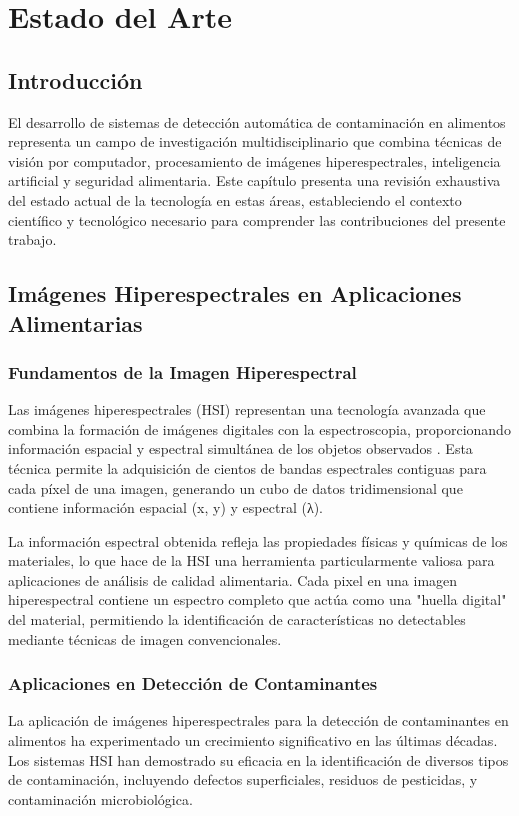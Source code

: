 \chapter{Estado del Arte}

\section{Introducción}
El desarrollo de sistemas de detección automática de contaminación en alimentos representa un campo de investigación multidisciplinario que combina técnicas de visión por computador, procesamiento de imágenes hiperespectrales, inteligencia artificial y seguridad alimentaria. Este capítulo presenta una revisión exhaustiva del estado actual de la tecnología en estas áreas, estableciendo el contexto científico y tecnológico necesario para comprender las contribuciones del presente trabajo.

\section{Imágenes Hiperespectrales en Aplicaciones Alimentarias}

\subsection{Fundamentos de la Imagen Hiperespectral}
Las imágenes hiperespectrales (HSI) representan una tecnología avanzada que combina la formación de imágenes digitales con la espectroscopia, proporcionando información espacial y espectral simultánea de los objetos observados \cite{lu2020medical,zhang2016hyperspectral}. Esta técnica permite la adquisición de cientos de bandas espectrales contiguas para cada píxel de una imagen, generando un cubo de datos tridimensional que contiene información espacial (x, y) y espectral (λ).

La información espectral obtenida refleja las propiedades físicas y químicas de los materiales, lo que hace de la HSI una herramienta particularmente valiosa para aplicaciones de análisis de calidad alimentaria. Cada pixel en una imagen hiperespectral contiene un espectro completo que actúa como una "huella digital" del material, permitiendo la identificación de características no detectables mediante técnicas de imagen convencionales.

\subsection{Aplicaciones en Detección de Contaminantes}
La aplicación de imágenes hiperespectrales para la detección de contaminantes en alimentos ha experimentado un crecimiento significativo en las últimas décadas. Los sistemas HSI han demostrado su eficacia en la identificación de diversos tipos de contaminación, incluyendo defectos superficiales, residuos de pesticidas, y contaminación microbiológica.

